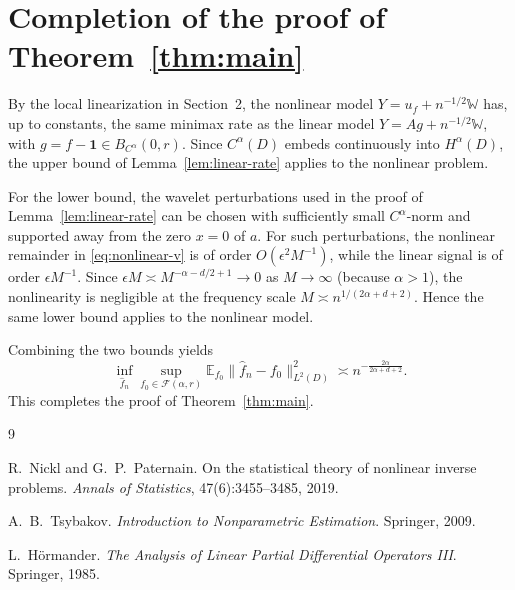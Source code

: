 \documentclass[11pt]{article}
\newcommand{\E}{\mathbb{E}}
\newcommand{\one}{\mathbf{1}}
\theoremstyle{remark}
\begin{document}
\section{Completion of the proof of Theorem~\ref{thm:main}}

By the local linearization in Section~2, the nonlinear model \(Y=u_f+n^{-1/2}\mathbb W\) has, up to constants, the same minimax rate as the linear model \(Y=A g+n^{-1/2}\mathbb W\), with \(g=f-\one\in B_{C^\alpha}(0,r)\). Since \(C^\alpha(D)\) embeds continuously into \(H^\alpha(D)\), the upper bound of Lemma~\ref{lem:linear-rate} applies to the nonlinear problem.

For the lower bound, the wavelet perturbations used in the proof of Lemma~\ref{lem:linear-rate} can be chosen with sufficiently small \(C^\alpha\)-norm and supported away from the zero \(x=0\) of \(a\). For such perturbations, the nonlinear remainder in \eqref{eq:nonlinear-v} is of order \(O(\epsilon^2 M^{-1})\), while the linear signal is of order \(\epsilon M^{-1}\). Since \(\epsilon M\asymp M^{-\alpha-d/2+1}\to0\) as \(M\to\infty\) (because \(\alpha>1\)), the nonlinearity is negligible at the frequency scale \(M\asymp n^{1/(2\alpha+d+2)}\). Hence the same lower bound applies to the nonlinear model.

Combining the two bounds yields
\[
\inf_{\hat f_n}\sup_{f_0\in\mathcal F(\alpha,r)}
\E_{f_0}\|\hat f_n-f_0\|_{L^2(D)}^2
\asymp
n^{-\frac{2\alpha}{2\alpha+d+2}}.
\]
This completes the proof of Theorem~\ref{thm:main}.

\begin{thebibliography}{9}

R.~Nickl and G.~P.~Paternain.
\newblock On the statistical theory of nonlinear inverse problems.
\newblock \emph{Annals of Statistics}, 47(6):3455--3485, 2019.

A.~B.~Tsybakov.
\newblock \emph{Introduction to Nonparametric Estimation}.
\newblock Springer, 2009.

L.~Hörmander.
\newblock \emph{The Analysis of Linear Partial Differential Operators III}.
\newblock Springer, 1985.

\end{thebibliography}
\end{document}

